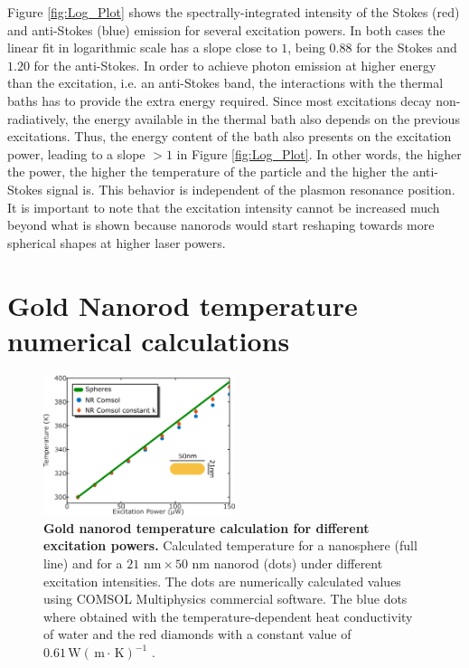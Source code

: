 \documentclass[journal=nalefd,manuscript=letter]{achemso}
\newcommand{\K}{\ensuremath{\,\textrm{K}}}
\newcommand{\nm}{\ensuremath{\,\textrm{nm}}}
\newcommand{\m}{\ensuremath{\,\textrm{m}}}
\newcommand{\W}{\ensuremath{\,\textrm{W}}}
\begin{document}
Figure \ref{fig:Log_Plot} shows the spectrally-integrated intensity of the Stokes (red) and
anti-Stokes (blue) emission for several excitation powers. In both cases the
linear fit in logarithmic scale has a slope close to $1$, being $0.88$ for the
Stokes and $1.20$ for the anti-Stokes. 
In order to achieve photon emission at higher energy than the excitation, 
i.e. an anti-Stokes band, the interactions with the thermal baths 
has to provide the extra energy required. Since most 
excitations decay non-radiatively, the energy available in the thermal bath 
also depends on the previous excitations. Thus, the energy content of the 
bath also presents on the excitation power, leading
to a slope $>1$ in Figure \ref{fig:Log_Plot}. In other words, the higher the power, 
the higher the temperature of the particle and the higher the anti-Stokes signal is. 
This behavior is independent of the plasmon resonance position. 
It is important to note that the excitation intensity cannot
be increased much beyond what is shown because nanorods would start reshaping
towards more spherical shapes at higher laser powers.



\pagebreak
\section{Gold Nanorod temperature numerical calculations} \label{sec:temp-calc}

\begin{figure}[htp] \centering
\includegraphics[width=0.5\textwidth]{Figures/Supplementary/04_Compare_Comsol/04_Compare_Comsol.png}
\caption{\textbf{Gold nanorod temperature calculation for different excitation powers.}
Calculated temperature for a nanosphere (full line) and 
for a $21\,\nm\times 50\,\nm$ nanorod (dots) under different excitation intensities. 
The dots are numerically calculated values using COMSOL Multiphysics commercial software. 
The blue dots where obtained with the temperature-dependent heat conductivity of water 
and the red diamonds with a constant value of $0.61 \W(\m\cdot\K)^{-1}$ .}
	\label{fig:Compare-Comsol}
\end{figure}
\end{document}
